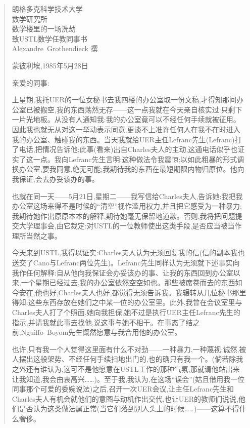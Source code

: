 \begin{quote}
\pmark{}朗格多克科学技术大学\\
数学研究所\\
数学楼里的一场洗劫\\
致USTL数学任教同事书\\
Alexandre~Grothendieck 撰

\hfill 蒙彼利埃,1985年5月28日

亲爱的同事:

上星期,我托UER的一位女秘书去我四楼的办公室取一份文稿,才得知那间办公室已被搬空,我的东西荡然无存——这一点我就在今天亲自核实过:只剩下一片光地板。从没有人通知我:我的办公室竟可以不经任何手续就被征用。因此我也就无从对这一举动表示同意,更谈不上准许任何人在我不在时进入我的办公室、触碰我的东西。当天我就给UER主任Lefranc先生(Lefranc)打了电话,把情况告诉他;此事(看来)出自Charles夫人的主动,这通电话似乎也证实了这一点。我向Lefranc先生言明:这种做法令我震惊;以如此粗暴的形式调换办公室,要我同意,绝无可能;我期待我的东西在最短期限内物归原位。他向我保证,会去办妥该办的事。

也就在同一天——5月21日,星期二——我写信给Charles夫人,告诉她:我把我办公室这场来得不是时候的“清空”视作滥用权力,并且把它感受为一种暴力;我期待她作出原原本本的解释,期待她毫无保留地道歉。否则,我将把问题提交大学理事会,由它裁定:对USTL的一位教师使出这类手段,是否应当被当作理所当然之事。

今天来到USTL,我得以证实:Charles夫人认为无须回复我的信(信的副本我也送交了Cano与Lefranc两位先生)。Lefranc先生同样认为无须就下述事实向我作任何解释:自从他向我保证会办妥该办的事、让我的东西回到办公室以来,一个星期已经过去,我的办公室依然空空如也。那些被席卷而去的东西如今安在,他也好,Charles夫人也好,都觉得无须告诉我。我辗转从几位秘书那里得知:这些东西存放在她们之中某一位的办公室里。此外,我曾在会议室里与Charles夫人打了个照面,她向我担保,她不过是执行UER主任Lefranc先生的指示,并请我就此事去找他,说这事与她不相干。在事态了结之前,Nguiffo~Boyom先生慨然愿意与我合用他的办公室。

\pmark{}也许,只有我一个人觉得这里面有什么不对劲——一种暴力,一种蔑视;诚然,被人摆出这般架势、不经任何手续扫地出门的,也的确只有我一个。(倘若除我之外还有谁认为,这可不是他愿意在USTL工作的那种气氛,那就请他站出来让我知道,我会由衷高兴……)。至于我,我认为,在这场“误会”(姑且借用我一位同事那个可爱的委婉说法)之后,召开一次UER会议,让主任Lefranc先生和Charles夫人有机会就他们的意图与动机作出交代,也让UER的教师们说说,他们是否认为这类做法属正常(当它们落到别人头上的时候……)——这算不得什么奢侈。


\end{quote}
